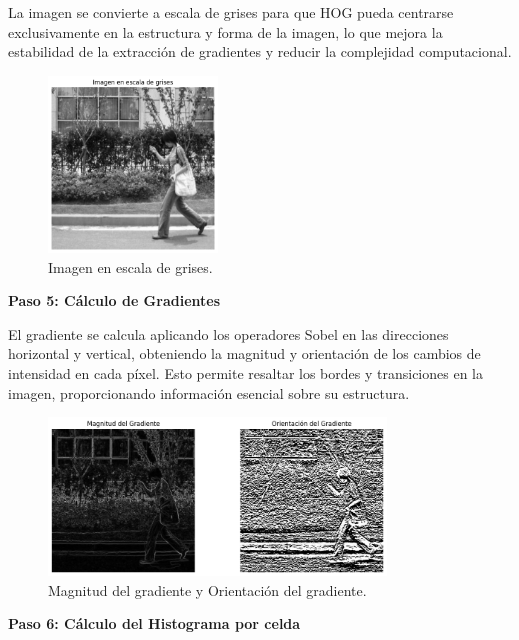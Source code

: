 \documentclass[a4paper]{article}
\begin{document}
La imagen se convierte a escala de grises para que HOG pueda centrarse exclusivamente en la estructura y forma de la imagen, lo que mejora la estabilidad de la extracción de gradientes y reducir la complejidad computacional.

\begin{figure}[H]
    \centering
    \includegraphics[width=0.4\textwidth]{images/hog_paso_4.png}
    \caption{Imagen en escala de grises.}
\end{figure}

\textbf{Paso 5: Cálculo de Gradientes}
\par\vspace{0.5cm}

El gradiente se calcula aplicando los operadores Sobel en las direcciones horizontal y vertical, obteniendo la magnitud y orientación de los cambios de intensidad en cada píxel. Esto permite resaltar los bordes y transiciones en la imagen, proporcionando información esencial sobre su estructura.

\begin{figure}[H]
    \centering
    \includegraphics[width=0.8\textwidth]{images/hog_paso_5.png}
    \caption{Magnitud del gradiente y Orientación del gradiente.}
\end{figure}

\textbf{Paso 6: Cálculo del Histograma por celda}
\par\vspace{0.5cm}
\end{document}
